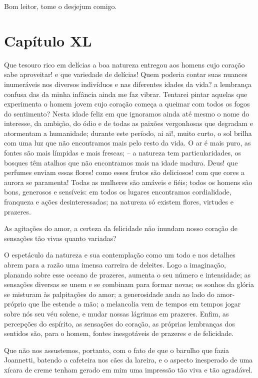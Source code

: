  Bom leitor, tome o desjejum comigo.

\section*{Capítulo XL}

 Que tesouro rico em delícias a boa natureza entregou aos homens cujo
coração sabe aproveitar! e que variedade de delícias! Quem poderia
contar suas nuances inumeráveis nos diversos indivíduos e nas
diferentes idades da vida? a lembrança confusa das da minha infância
ainda me faz vibrar. Tentarei pintar aquelas que experimenta o homem
jovem cujo coração começa a queimar com todos os fogos do sentimento?
Nesta idade feliz em que ignoramos ainda até mesmo o nome do interesse,
da ambição, do ódio e de todas as paixões vergonhosas que degradam e
atormentam a humanidade; durante este período, ai ai!, muito curto, o
sol brilha com uma luz que não encontramos mais pelo resto da vida. O
ar é mais puro, as fontes são mais límpidas e mais frescas; -- a
natureza tem particularidades, os bosques têm atalhos que não
encontramos mais na idade madura. Deus! que perfumes enviam essas
flores! como esses frutos são deliciosos! com que cores a aurora se
paramenta! Todas as mulheres são amáveis e fiéis; todos os homens são
bons, generosos e sensíveis: em todos os lugares encontramos
cordialidade, franqueza e ações desinteressadas; na natureza só existem
flores, virtudes e prazeres.

 As agitações do amor, a certeza da felicidade não inundam nosso coração
de sensações tão vivas quanto variadas?

 O espetáculo da natureza e sua contemplação como um todo e nos detalhes
abrem para a razão uma imensa carreira de deleites. Logo a imaginação,
planando sobre esse oceano de prazeres, aumenta o seu número e
intensidade; as sensações diversas se unem e se combinam para formar
novas; os sonhos da glória se misturam às palpitações do amor; a
generosidade anda ao lado do amor-próprio que lhe estende a mão; a
melancolia vem de tempos em tempos jogar sobre nós seu véu solene, e
mudar nossas lágrimas em prazeres. Enfim, as percepções do espírito, as
sensações do coração, as próprias lembranças dos sentidos são, para o
homem, fontes inesgotáveis de prazeres e de felicidade.

 Que não nos assustemos, portanto, com o fato de que o barulho que fazia
Joannetti, batendo a cafeteira nos cães da lareira, e o aspecto
inesperado de uma xícara de creme tenham gerado em mim uma impressão
tão viva e tão agradável.

